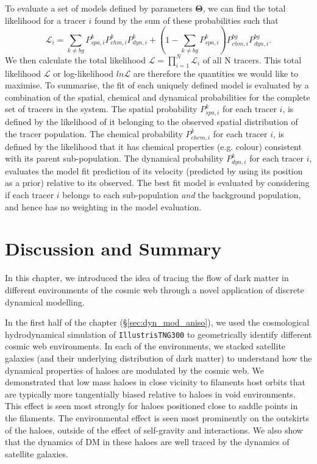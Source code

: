 To evaluate a set of models defined by parameters $\boldsymbol{\Theta}$, we can find the total likelihood for a tracer $i$ found by the sum of these probabilities such that
\begin{equation}
\mathcal{L}_i = \sum_{k \neq bg} P^{k}_{spa,i} P^{k}_{chm,i} P^{k}_{dyn,i} + \left(1 - \sum_{k \neq bg} P^{k}_{spa,i} \right) P^{bg}_{chm,i} P^{bg}_{dyn,i}.
\end{equation}
We then calculate the total likelihood $\mathcal{L} = \prod^N_{i=1} \mathcal{L}_i$ of all N tracers. This total likelihood $\mathcal{L}$ or log-likelihood $ln \mathcal{L}$ are therefore the quantities we would like to maximise. To summarise, the fit of each uniquely defined model is evaluated by a combination of the spatial, chemical and dynamical probabilities for the complete set of tracers in the system. The spatial probability $P^{k}_{spa,i}$ for each tracer $i$, is defined by the likelihood of it belonging to the observed spatial distribution of the tracer population. The chemical probability $P^{k}_{chem,i}$ for each tracer $i$, is defined by the likelihood that it has chemical properties (e.g. colour) consistent with its parent sub-population. The dynamical probability $P^{k}_{dyn,i}$ for each tracer $i$, evaluates the model fit prediction of its velocity (predicted by using its position as a prior) relative to its observed. The best fit model is evaluated by considering if each tracer $i$ belongs to each sub-population \textit{and} the background population, and hence has no weighting in the model evaluation.

\section{Discussion and Summary} \label{sec:dyn_mod_conclusions}
In this chapter, we introduced the idea of tracing the flow of dark matter in different environments of the cosmic web through a novel application of discrete dynamical modelling. 

In the first half of the chapter (\S\ref{sec:dyn_mod_aniso}), we used the cosmological hydrodynamical simulation of \texttt{IllustrisTNG300} to geometrically identify different cosmic web environments. In each of the environments, we stacked satellite galaxies (and their underlying distribution of dark matter) to understand how the dynamical properties of haloes are modulated by the cosmic web. We demonstrated that low mass haloes in close vicinity to filaments host orbits that are typically more tangentially biased relative to haloes in void environments. This effect is seen most strongly for haloes positioned close to saddle points in the filaments. The environmental effect is seen most prominently on the outskirts of the haloes, outside of the effect of self-gravity and interactions. We also show that the dynamics of DM in these haloes are well traced by the dynamics of satellite galaxies. 

